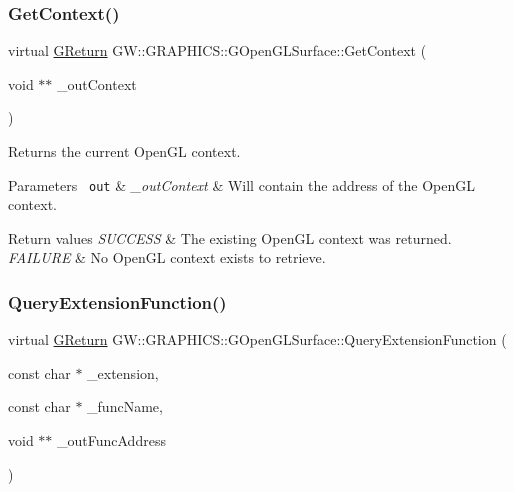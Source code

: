 \subsubsection{\texorpdfstring{GetContext()}{GetContext()}}
{\footnotesize\ttfamily virtual \mbox{\hyperlink{namespaceGW_a67a839e3df7ea8a5c5686613a7a3de21}{G\+Return}} G\+W\+::\+G\+R\+A\+P\+H\+I\+C\+S\+::\+G\+Open\+G\+L\+Surface\+::\+Get\+Context (\begin{DoxyParamCaption}\item[{void $\ast$$\ast$}]{\+\_\+out\+Context }\end{DoxyParamCaption})\hspace{0.3cm}{\ttfamily [pure virtual]}}



Returns the current Open\+GL context. 


\begin{DoxyParams}[1]{Parameters}
\mbox{\texttt{ out}}  & {\em \+\_\+out\+Context} & Will contain the address of the Open\+GL context.\\
\hline
\end{DoxyParams}

\begin{DoxyRetVals}{Return values}
{\em S\+U\+C\+C\+E\+SS} & The existing Open\+GL context was returned. \\
\hline
{\em F\+A\+I\+L\+U\+RE} & No Open\+GL context exists to retrieve. \\
\hline
\end{DoxyRetVals}
\mbox{\label{classGW_1_1GRAPHICS_1_1GOpenGLSurface_a045548083dbdd547b18ef9b9a896f0de}} 
\subsubsection{\texorpdfstring{QueryExtensionFunction()}{QueryExtensionFunction()}}
{\footnotesize\ttfamily virtual \mbox{\hyperlink{namespaceGW_a67a839e3df7ea8a5c5686613a7a3de21}{G\+Return}} G\+W\+::\+G\+R\+A\+P\+H\+I\+C\+S\+::\+G\+Open\+G\+L\+Surface\+::\+Query\+Extension\+Function (\begin{DoxyParamCaption}\item[{const char $\ast$}]{\+\_\+extension,  }\item[{const char $\ast$}]{\+\_\+func\+Name,  }\item[{void $\ast$$\ast$}]{\+\_\+out\+Func\+Address }\end{DoxyParamCaption})\hspace{0.3cm}{\ttfamily [pure virtual]}}



